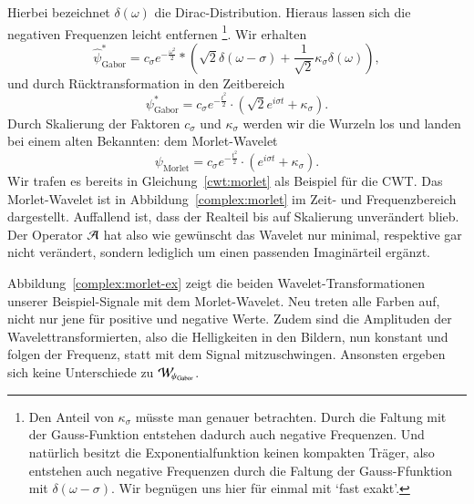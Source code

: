 Hierbei bezeichnet $\delta(\omega)$ die Dirac-Distribution.
Hieraus lassen sich die negativen Frequenzen leicht entfernen
\footnote{
	Den Anteil von $\kappa_\sigma$ müsste man genauer betrachten.
	Durch die Faltung mit der Gauss-Funktion entstehen dadurch auch negative Frequenzen.
	Und natürlich besitzt die Exponentialfunktion keinen kompakten Träger, also entstehen auch negative Frequenzen durch die Faltung der Gauss-Ffunktion mit $\delta(\omega - \sigma)$.
	Wir begnügen uns hier für einmal mit `fast exakt'.
}.
Wir erhalten
\[
	\hat{\psi}^\ast_\text{Gabor} = 
	c_\sigma e^{- \frac{\omega^2}{2}} * (
	\!\sqrt 2 \delta(\omega - \sigma) +
	\frac{1}{\sqrt 2}\kappa_\sigma\delta(\omega) ),
\]
und durch Rücktransformation in den Zeitbereich
\[
	\psi^\ast_\text{Gabor} = c_\sigma e^{- \frac{t^2}{2}} \cdot (\!\sqrt 2 e^{i\sigma t} +	\kappa_\sigma ).
\]
Durch Skalierung der Faktoren $c_\sigma$ und $\kappa_\sigma$ werden wir die Wurzeln los und landen bei einem alten Bekannten: dem Morlet-Wavelet
\[\psi_\text{Morlet} = c_\sigma e^{- \frac{t^2}{2}} \cdot (e^{i\sigma t} + \kappa_\sigma).\]
Wir trafen es bereits in Gleichung~\eqref{cwt:morlet} als Beispiel für die CWT.
Das Morlet-Wavelet ist in Abbildung~\ref{complex:morlet} im Zeit- und Frequenzbereich dargestellt.
Auffallend ist, dass der Realteil bis auf Skalierung unverändert blieb.
Der Operator $\Ana\,$ hat also wie gewünscht das Wavelet nur minimal, respektive gar nicht verändert, sondern lediglich um einen passenden Imaginärteil ergänzt.

Abbildung~\ref{complex:morlet-ex} zeigt die beiden Wavelet-Transformationen unserer Beispiel-Signale mit dem Morlet-Wavelet.
Neu treten alle Farben auf, nicht nur jene für positive und negative Werte.
Zudem sind die Amplituden der Wavelettransformierten, also die Helligkeiten in den Bildern, nun konstant und folgen der Frequenz, statt mit dem Signal mitzuschwingen.
Ansonsten ergeben sich keine Unterschiede zu $\Wave_{\psi_\text{Gabor}}$.

